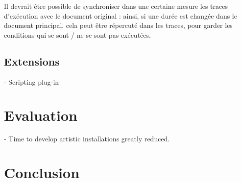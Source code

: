 \documentclass{sigchi}
\begin{document}
Il devrait être possible de synchroniser dans une certaine mesure les traces d'exécution avec le document original : ainsi, si une durée est changée dans le document principal, cela peut être répercuté dans les traces, pour garder les conditions qui se sont / ne se sont pas exécutées.


\subsection{Extensions}
- Scripting plug-in

\section{Evaluation}
- Time to develop artistic installations greatly reduced.

\section{Conclusion}



\end{document}
